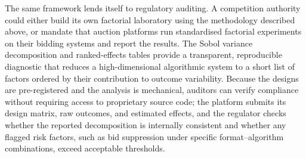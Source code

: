 The same framework lends itself to regulatory auditing. A competition authority could either build its own factorial laboratory using the methodology described above, or mandate that auction platforms run standardised factorial experiments on their bidding systems and report the results. The Sobol variance decomposition and ranked-effects tables provide a transparent, reproducible diagnostic that reduces a high-dimensional algorithmic system to a short list of factors ordered by their contribution to outcome variability. Because the designs are pre-registered and the analysis is mechanical, auditors can verify compliance without requiring access to proprietary source code; the platform submits its design matrix, raw outcomes, and estimated effects, and the regulator checks whether the reported decomposition is internally consistent and whether any flagged risk factors, such as bid suppression under specific format--algorithm combinations, exceed acceptable thresholds.

